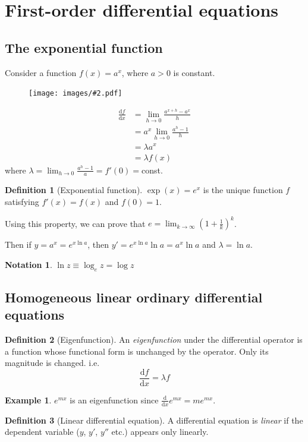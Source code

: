 \documentclass[a4paper]{article}
\theoremstyle{definition}
\newtheorem*{defi}{Definition}
\newtheorem*{eg}{Example}
\newtheorem*{notation}{Notation}
\renewcommand{\d}{\mathrm{d}}
\let\stdsection\section
\renewcommand\section{\newpage\stdsection}
\newcommand{\img}[2][]{\begin{figure}[ht]\centering\texttt{[image: images/\#2.pdf]}\end{figure}}
\begin{document}
\section{First-order differential equations}
\subsection{The exponential function}
Consider a function $f(x) = a^x$, where $a>0$ is constant. 
\img{de_2}
\begin{align*}
  \frac{\d f}{\d x} &= \lim_{h\to 0}\frac{a^{x+h}-a^x}{h}\\
  &= a^x\lim_{h\to 0}\frac{a^h-1}{h}\\
  &= \lambda a^x\\
  &= \lambda f(x)
\end{align*}
where $\displaystyle \lambda = \lim_{h\to 0}\frac{a^h-1}{a} = f'(0) = $const.

\begin{defi}[Exponential function]
  $\exp(x) = e^x$ is the unique function $f$ satisfying $f'(x) = f(x)$ and $f(0) = 1$.
\end{defi}

Using this property, we can prove that $\displaystyle e=\lim_{k\to \infty} \left(1 + \frac{1}{k}\right)^k$. 

Then if $y = a^x = e^{x\ln a}$, then $y' = e^{x\ln a}\ln a = a^x\ln a$ and $\lambda = \ln a$. 

\begin{notation}
  $\ln z \equiv \log_e z = \log z$
\end{notation}

\subsection{Homogeneous linear ordinary differential equations}
\begin{defi}[Eigenfunction]
  An \emph{eigenfunction} under the differential operator is a function whose functional form is unchanged by the operator. Only its magnitude is changed. i.e.
  \[
  \frac{\d f}{\d x} = \lambda f
  \]
\end{defi}
\begin{eg}
$e^{mx}$ is an eigenfunction since $\frac{\d }{\d x}e^{mx} = me^{mx}$.
\end{eg}

\begin{defi}[Linear differential equation]
  A differential equation is \emph{linear} if the dependent variable ($y$, $y'$, $y''$ etc.) appears only linearly.
\end{defi}
\end{document}
